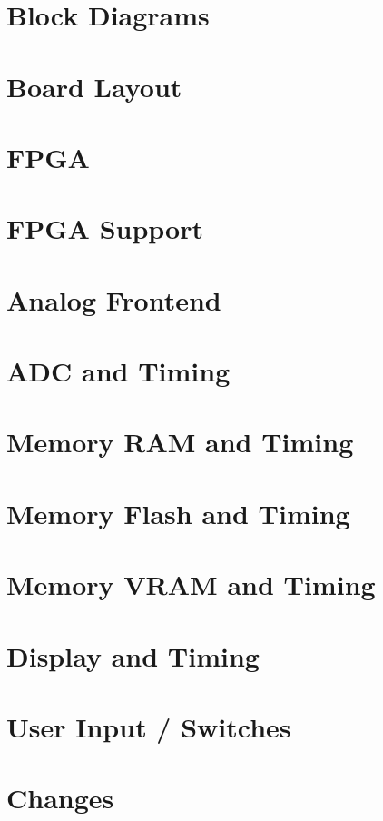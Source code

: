 \section{Block Diagrams} %

\section{Board Layout} %

\section{FPGA}

\section{FPGA Support}

\section{Analog Frontend}

\section{ADC and Timing}

\section{Memory RAM and Timing}

\section{Memory Flash and Timing}

\section{Memory VRAM and Timing}

\section{Display and Timing}

\section{User Input / Switches}

\section{Changes}
